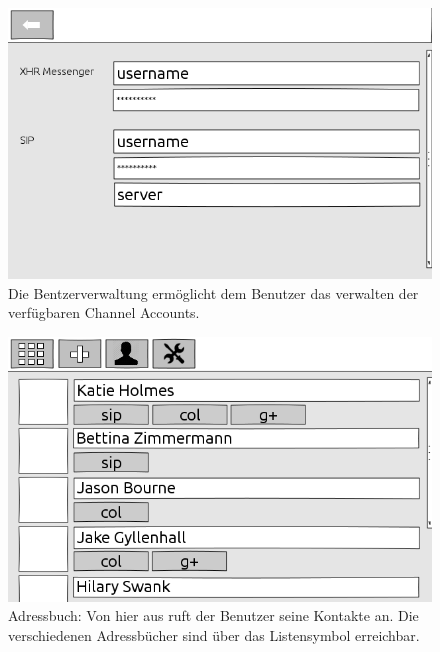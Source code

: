 		\begin{figure}[H]
		\centering
		\includegraphics[height=0.4\textheight]{../ui/img/uiDraft2/UserView-addChannel.png}
		\caption[Channel edit screen draft2]{Die Bentzerverwaltung ermöglicht dem Benutzer das verwalten der verfügbaren Channel Accounts.}
		\label{user management screen}
	\end{figure}
	\begin{figure}[H]
		\centering
		\includegraphics[height=0.4\textheight]{../ui/img/uiDraft2/ContactbookView.png}
		\caption[Contactbook screen draft2]{Adressbuch: Von hier aus ruft der Benutzer seine Kontakte an. Die verschiedenen Adressbücher sind über das Listensymbol erreichbar.}
		\label{contactbook screen}
	\end{figure}
